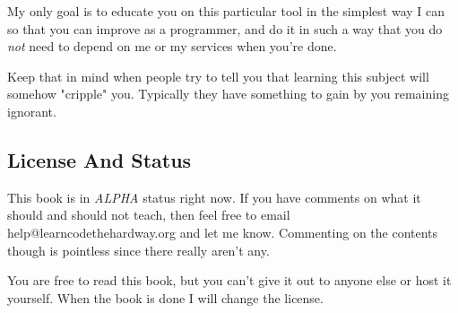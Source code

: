 My only goal is to educate you on this particular tool in the simplest way
I can so that you can improve as a programmer, and do it in such a way that
you do \emph{not} need to depend on me or my services when you're done.

Keep that in mind when people try to tell you that learning this subject will
somehow "cripple" you.  Typically they have something to gain by you remaining
ignorant.

\subsection*{License And Status}

This book is in \emph{ALPHA} status right now.  If you have comments on what it
should and should not teach, then feel free to email help@learncodethehardway.org
and let me know.  Commenting on the contents though is pointless since there
really aren't any.

You are free to read this book, but you can't give it out to anyone else or
host it yourself.  When the book is done I will change the license.

